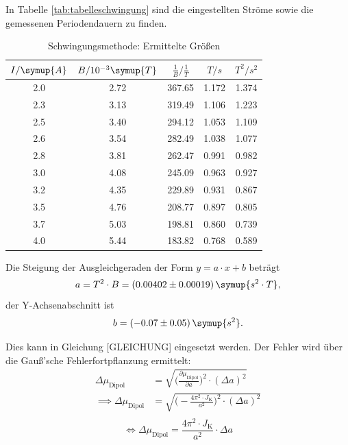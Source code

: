 In Tabelle \eqref{tab:tabelleschwingung} sind die eingestellten Ströme sowie die gemessenen Periodendauern zu finden.
\begin{table}[htbp]
\centering
\caption{Schwingungsmethode: Ermittelte Größen}
\label{tab:tabelleschwingung}
\begin{tabular}{S[table-format=1.1] S[table-format=1.2] S[table-format=3.2] S[table-format=1.3] S[table-format=1.3]}
\toprule
 {$I/\symup{A}$} & {$B/10^{-3}\symup{T}$} & {$\frac{1}{B}/\frac{1}{T}$} & {$T/s$} & {$T^2/s^2$} \\
 &  2.72 & 367.65 & 1.172 & 1.374 \\
2.3 &  3.13 & 319.49 & 1.106 & 1.223 \\
2.5 &  3.40 & 294.12 & 1.053 & 1.109 \\
2.6 &  3.54 & 282.49 & 1.038 & 1.077 \\
2.8 &  3.81 & 262.47 & 0.991 & 0.982 \\
3.0 &  4.08 & 245.09 & 0.963 & 0.927 \\
3.2 &  4.35 & 229.89 & 0.931 & 0.867 \\
3.5 &  4.76 & 208.77 & 0.897 & 0.805 \\
3.7 &  5.03 & 198.81 & 0.860 & 0.739 \\
4.0 &  5.44 & 183.82 & 0.768 & 0.589 \\

\bottomrule
\end{tabular}
\end{table}


Die Steigung der Ausgleichgeraden der Form $y = a \cdot x + b$ beträgt 
\begin{equation*}
a = T^2\cdot B = (0.00402 \pm 0.00019)\, \symup{s^2\cdot T}, 
\end{equation*}
der Y-Achsenabschnitt ist 
\begin{equation*}
b = (-0.07 \pm 0.05)\, \symup{s^2}. 
\end{equation*}

Dies kann in Gleichung  [GLEICHUNG] eingesetzt werden. Der Fehler wird über die Gauß'sche Fehlerfortpflanzung ermittelt:
\begin{equation*}
\begin{aligned}
\Delta{\mu_{\text{Dipol}}} &= \sqrt{\biggl(\frac{\partial \mu_{\text{Dipol}}}{\partial a}\biggr)^2 \cdot (\Delta a)^2} \\
\implies \Delta{\mu_{\text{Dipol}}} &= \sqrt{\biggl(- \frac{4\pi^2 \cdot J_{\text{K}}}{a^2}\biggr)^2 \cdot (\Delta a)^2} \\
\end{aligned}
\end{equation*}
\begin{equation}
\iff \Delta{\mu_{\text{Dipol}}} = \frac{4\pi^2 \cdot J_{\text{K}}}{a^2} \cdot \Delta a
\label{eq:schwingungsfehler}
\end{equation}

